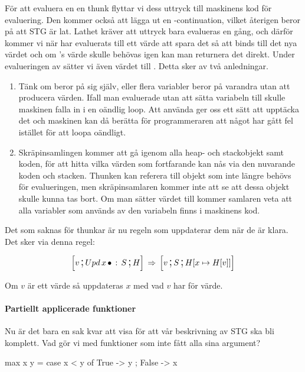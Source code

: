 \documentclass[../Core]{subfiles}
\begin{document}
För att evaluera en en thunk flyttar vi dess uttryck till maskinens kod
för evaluering. Den kommer också att lägga ut en -continuation, vilket
återigen beror på att STG är lat. Lathet kräver att uttryck bara evalueras
en gång, och därför kommer vi när  har evaluerats till ett värde att spara
det så att  binds till det nya värdet och om 's värde skulle behövas
igen kan man returnera det direkt. Under evalueringen av  sätter
vi även värdet  till . Detta sker av två anledningar.
\begin{enumerate}
\item Tänk om  beror på sig själv, eller flera variabler beror på varandra utan
att producera värden. Ifall man evaluerade utan att sätta variabeln till 
skulle maskinen falla in i en oändlig loop. Att använda  ger oss ett sätt att
upptäcka det och maskinen kan då berätta för programmeraren att något har gått fel
istället för att loopa oändligt.
\item Skräpinsamlingen kommer att gå igenom alla heap- och stackobjekt
samt koden, för att hitta vilka värden som fortfarande kan nås via den nuvarande
koden och stacken. Thunken kan referera till objekt som inte längre
behövs för evalueringen, men skräpinsamlaren kommer inte att se att dessa objekt skulle
kunna tas bort. Om man sätter värdet till 
kommer samlaren veta att alla variabler som används av den variabeln finns
i maskinens kod.
\end{enumerate}
Det som saknas för thunkar är nu regeln som uppdaterar dem när de
är klara. Det sker via denna regel:

\[
\text{\large$$}\Big[v \,\text{\Large;}\, Upd\, x\,\bullet \,:\, S \,\text{\Large;}\, H\Big] \,\Rightarrow\, \text{\large$$}\Big[v \,\text{\Large;}\, S \,\text{\Large;}\, H[x\mapsto H[v]]\Big]
\]

Om $v$ är ett värde så uppdateras $x$ med vad $v$ har för värde.

\paragraph{Partiellt applicerade funktioner} Nu är det bara en sak kvar att visa för att vår beskrivning av STG ska bli komplett.
Vad gör vi med funktioner som inte fått alla sina argument?

\begin{codeEx}
max x y = case x < y of
    { True  -> y
    ; False -> x
    }
\end{codeEx}
\end{document}
